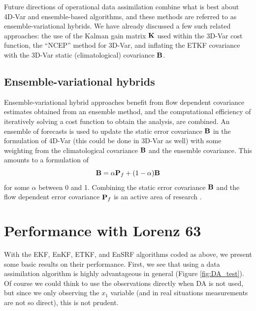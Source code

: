 Future directions of operational data assimilation combine what is best about 4D-Var and ensemble-based algorithms, and these methods are referred to as ensemble-variational hybrids.
We have already discussed a few such related approaches: the use of the Kalman gain matrix $\mathbf{K}$ used within the 3D-Var cost function, the ``NCEP'' method for 3D-Var, and inflating the ETKF covariance with the 3D-Var static (climatological) covariance $\mathbf{B}$.

\subsection{Ensemble-variational hybrids}

Ensemble-variational hybrid approaches benefit from flow dependent covariance estimates obtained from an ensemble method, and the computational efficiency of iteratively solving a cost function to obtain the analysis, are combined.
An ensemble of forecasts is used to update the static error covariance $\mathbf{B}$ in the formulation of 4D-Var (this could be done in 3D-Var as well) with some weighting from the climatological covariance $\mathbf{B}$ and the ensemble covariance.
This amounts to a formulation of
\begin{equation} \mathbf{B} = \alpha \mathbf{P}_f + (1-\alpha) \mathbf{B} \end{equation}
for some $\alpha$ between 0 and 1.
Combining the static error covariance $\mathbf{B}$ and the flow dependent error covariance $\mathbf{P}_f$ is an active area of research .


\section{Performance with Lorenz 63}

With the EKF, EnKF, ETKF, and EnSRF algorithms coded as above, we present some basic results on their performance. 
First, we see that using a data assimilation algorithm is highly advantageous in general (Figure \ref{fig:DA_test}).
Of course we could think to use the observations directly when DA is not used, but since we only observing the $x_1$ variable (and in real situations measurements are not so direct), this is not prudent.

